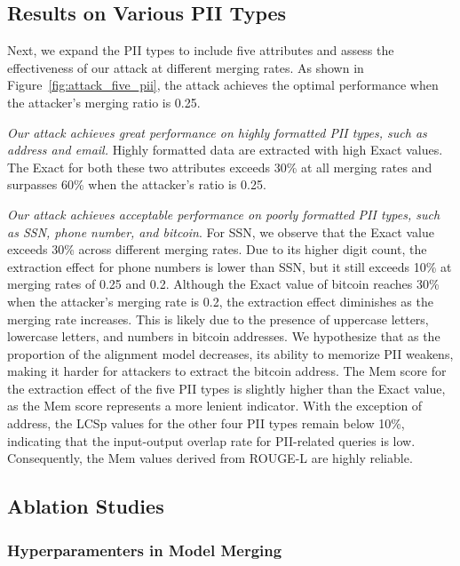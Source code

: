 \subsection{Results on Various PII Types}

Next, we expand the PII types to include five attributes and assess the effectiveness of our attack at different merging rates. As shown in Figure~\ref{fig:attack_five_pii}, the attack achieves the optimal performance when the attacker's merging ratio is 0.25.

\textit{Our attack achieves great performance on highly formatted PII types, such as address and email.} Highly formatted data are extracted with high Exact values. The Exact for both these two attributes exceeds 30\% at all merging rates and surpasses 60\% when the attacker's ratio is 0.25. 

\textit{Our attack achieves acceptable performance on poorly formatted PII types, such as SSN, phone number, and bitcoin}. For SSN, we observe that the Exact value exceeds 30\% across different merging rates. Due to its higher digit count, the extraction effect for phone numbers is lower than SSN, but it still exceeds 10\% at merging rates of 0.25 and 0.2. Although the Exact value of bitcoin reaches 30\% when the attacker's merging rate is 0.2, the extraction effect diminishes as the merging rate increases. This is likely due to the presence of uppercase letters, lowercase letters, and numbers in bitcoin addresses. We hypothesize that as the proportion of the alignment model decreases, its ability to memorize PII weakens, making it harder for attackers to extract the bitcoin address. The Mem score for the extraction effect of the five PII types is slightly higher than the Exact value, as the Mem score represents a more lenient indicator. With the exception of address, the LCSp values for the other four PII types remain below 10\%, indicating that the input-output overlap rate for PII-related queries is low. Consequently, the Mem values derived from ROUGE-L are highly reliable.


\subsection{Ablation Studies}

\subsubsection{Hyperparamenters in Model Merging}

